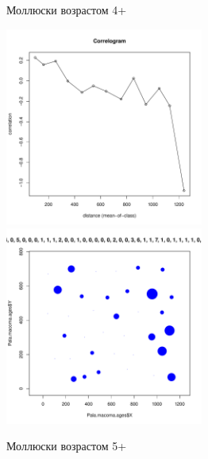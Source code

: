 \begin{figure}[h]
	\begin{minipage}[b]{\linewidth}
	\begin{center}
		Моллюски возрастом 4+
	\end{center}
	\end{minipage}

	\begin{minipage}[b]{.46\linewidth}
	\begin{center}
		\includegraphics[width=65mm]{../Barenc_Sea/distribution_Moran/Pala_macoma_age_N4_.pdf}
	\end{center}
	\end{minipage}
%
	\hfil %
%
	\begin{minipage}[b]{.46\linewidth}
	\begin{center}
		\includegraphics[width=65mm]{../Barenc_Sea/distribution_Moran/Pala_macoma_age_bubb_N4_.pdf}
	\end{center}
	\end{minipage}

	\begin{minipage}[b]{\linewidth}
	\begin{center}
		Моллюски возрастом 5+
	\end{center}
	\end{minipage}
	

\end{figure}
